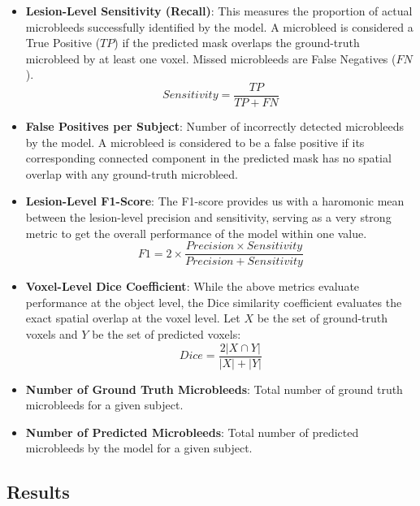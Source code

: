 \documentclass{aifyp}
\begin{document}
\begin{itemize}
    \item \textbf{Lesion-Level Sensitivity (Recall)}: This measures the proportion of actual microbleeds successfully identified by the model. A microbleed is considered a True Positive ($TP$) if the predicted mask overlaps the ground-truth microbleed by at least one voxel. Missed microbleeds are False Negatives ($FN$).
    \begin{equation}
        Sensitivity = \frac{TP}{TP + FN}
    \end{equation}
    
    \item \textbf{False Positives per Subject}: Number of incorrectly detected microbleeds by the model. A microbleed is considered to be a false positive if its corresponding connected component in the predicted mask has no spatial overlap with any ground-truth microbleed.

    \item \textbf{Lesion-Level F1-Score}: The F1-score provides us with a haromonic mean between the lesion-level precision and sensitivity, serving as a very strong metric to get the overall performance of the model within one value.
    \begin{equation}
        F1 = 2 \times \frac{Precision \times Sensitivity}{Precision + Sensitivity}
    \end{equation}

    \item \textbf{Voxel-Level Dice Coefficient}: While the above metrics evaluate performance at the object level, the Dice similarity coefficient evaluates the exact spatial overlap at the voxel level. Let $X$ be the set of ground-truth voxels and $Y$ be the set of predicted voxels:
    \begin{equation}
        Dice = \frac{2 |X \cap Y|}{|X| + |Y|}
    \end{equation}

    \item \textbf{Number of Ground Truth Microbleeds}: Total number of ground truth microbleeds for a given subject.
    
    \item \textbf{Number of Predicted Microbleeds}: Total number of predicted microbleeds by the model for a given subject.
\end{itemize}

\subsection{Results}
\end{document}

